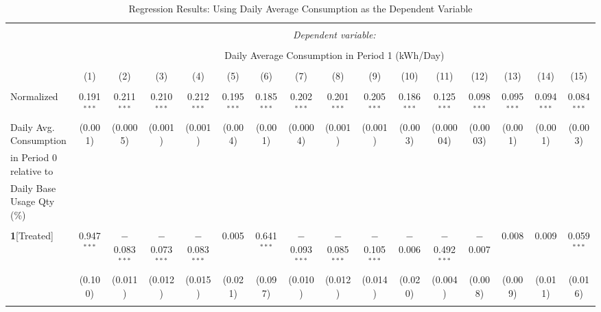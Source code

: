 \begin{table}[!htbp] \centering 
\caption{Regression Results: Using Daily Average Consumption as the Dependent Variable} 
\label{Table:Regression-Results_Daily-Daily} 
\small 

\begin{adjustbox}{scale = 0.8}

\begin{tabular}{@{\extracolsep{-7pt}}lccccccccccccccc} 
\\[-1.8ex]\hline 
\hline \\[-1.8ex] 
 & \multicolumn{15}{c}{\textit{Dependent variable:}} \\ 
\cline{2-16} 
\\[-1.8ex] & \multicolumn{15}{c}{Daily Average Consumption in Period 1 (kWh/Day)} \\ 
\\[-1.8ex] & (1) & (2) & (3) & (4) & (5) & (6) & (7) & (8) & (9) & (10) & (11) & (12) & (13) & (14) & (15)\\ 
\hline \\[-1.8ex] 
 Normalized & 0.191$^{***}$ & 0.211$^{***}$ & 0.210$^{***}$ & 0.212$^{***}$ & 0.195$^{***}$ & 0.185$^{***}$ & 0.202$^{***}$ & 0.201$^{***}$ & 0.205$^{***}$ & 0.186$^{***}$ & 0.125$^{***}$ & 0.098$^{***}$ & 0.095$^{***}$ & 0.094$^{***}$ & 0.084$^{***}$ \\ 
 Daily Avg. Consumption & (0.001) & (0.0005) & (0.001) & (0.001) & (0.004) & (0.001) & (0.0004) & (0.001) & (0.001) & (0.003) & (0.00004) & (0.0003) & (0.001) & (0.001) & (0.003) \\ 
 in Period 0 relative to & & & & & & & & & & & & & & & \\ 
 Daily Base Usage Qty (\%) & & & & & & & & & & & & & & & \\ 
  & & & & & & & & & & & & & & & \\ 
 \textbf{1}[Treated] & 0.947$^{***}$ & $-$0.083$^{***}$ & $-$0.073$^{***}$ & $-$0.083$^{***}$ & 0.005 & 0.641$^{***}$ & $-$0.093$^{***}$ & $-$0.085$^{***}$ & $-$0.105$^{***}$ & $-$0.006 & $-$0.492$^{***}$ & $-$0.007 & 0.008 & 0.009 & 0.059$^{***}$ \\ 
  & (0.100) & (0.011) & (0.012) & (0.015) & (0.021) & (0.097) & (0.010) & (0.012) & (0.014) & (0.020) & (0.004) & (0.008) & (0.009) & (0.011) & (0.016) \\ 
  & & & & & & & & & & & & & & & \\

\end{tabular}
\end{adjustbox}
\end{table}
